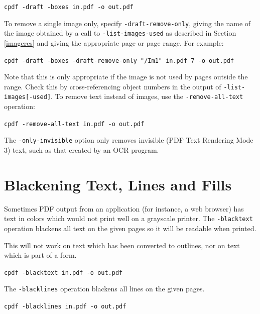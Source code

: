 \documentclass{book}
\begin{document}
  \begin{framed}
    \noindent\small\verb!cpdf -draft -boxes in.pdf -o out.pdf!
  \end{framed}

\noindent To remove a single image only, specify \texttt{-draft-remove-only}, giving the name of the image obtained by a call to \texttt{-list-images-used} as described in Section \ref{imageres} and giving the appropriate page or page range. For example:

  \begin{framed}
    \noindent\small\verb!cpdf -draft -boxes -draft-remove-only "/Im1" in.pdf 7 -o out.pdf!
  \end{framed}

\noindent Note that this is only appropriate if the image is not used by pages outside the range. Check this by cross-referencing object numbers in the output of \texttt{-list-images[-used]}. To remove text instead of images, use the \texttt{-remove-all-text} operation:

  \begin{framed}
    \noindent\small\verb!cpdf -remove-all-text in.pdf -o out.pdf!
  \end{framed}

\noindent The \texttt{-only-invisible} option only removes invisible (PDF Text Rendering Mode 3) text, such as that created by an OCR program.

  \section{Blackening Text, Lines and Fills}
  Sometimes PDF output from an application (for instance, a web browser) has
text in colors which would not print well on a grayscale printer. The
\texttt{-blacktext} operation blackens all text on the given pages so it will be readable
when printed.

  This will not work on text which has been converted to outlines, nor on text
which is part of a form.

  \begin{framed}
    \noindent\small\verb!cpdf -blacktext in.pdf -o out.pdf!
  \end{framed}


\noindent The \texttt{-blacklines} operation blackens all lines on the given pages.

  \begin{framed}
    \noindent\small\verb!cpdf -blacklines in.pdf -o out.pdf!
  \end{framed}
\end{document}
